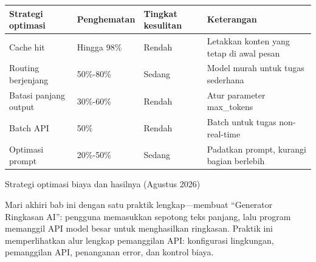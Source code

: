\begin{center}
\begin{tabularx}{\linewidth}{|X|X|X|X|}
\hline
\textbf{Strategi optimasi} & \textbf{Penghematan} & \textbf{Tingkat kesulitan} & \textbf{Keterangan} \tabularnewline
\hline
Cache hit & Hingga 98\% & Rendah & Letakkan konten yang tetap di awal pesan \tabularnewline
Routing berjenjang & 50\%-80\% & Sedang & Model murah untuk tugas sederhana \tabularnewline
Batasi panjang output & 30\%-60\% & Rendah & Atur parameter max\_tokens \tabularnewline
Batch API & 50\% & Rendah & Batch untuk tugas non-real-time \tabularnewline
Optimasi prompt & 20\%-50\% & Sedang & Padatkan prompt, kurangi bagian berlebih \tabularnewline
\hline
\end{tabularx}
\end{center}

\begin{center}\small\color{gray}Strategi optimasi biaya dan hasilnya (Agustus 2026)\end{center}


Mari akhiri bab ini dengan satu praktik lengkap—membuat “Generator Ringkasan AI”: pengguna memasukkan sepotong teks panjang, lalu program memanggil API model besar untuk menghasilkan ringkasan. Praktik ini memperlihatkan alur lengkap pemanggilan API: konfigurasi lingkungan, pemanggilan API, penanganan error, dan kontrol biaya.

